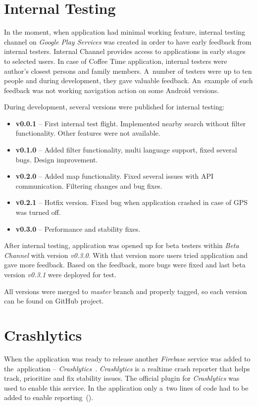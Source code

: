 \section{Internal Testing}
In the moment, when application had minimal working feature, internal testing channel on \textit{Google Play Services} was created in order to have early feedback from internal testers. Internal Channel provides access to applications in early stages to selected users. In case of Coffee Time application, internal testers were author's closest persons and family members. A~number of testers were up to ten people and during development, they gave valuable feedback. An~example of such feedback was not working navigation action on some Android versions. 

During development, several versions were published for internal testing:

\begin{itemize}
    \item \textbf{v0.0.1} -- First internal test flight. Implemented nearby search without filter functionality. Other features were not available. 
    \item \textbf{v0.1.0} -- Added filter functionality, multi language support, fixed several bugs. Design improvement. 
    \item \textbf{v0.2.0} -- Added map functionality. Fixed several issues with API communication. Filtering changes and bug fixes.
    \item \textbf{v0.2.1} -- Hotfix version. Fixed bug when application crashed in case of GPS was turned off. 
    \item \textbf{v0.3.0} -- Performance and stability fixes. 
\end{itemize}

After internal testing, application was opened up for beta testers within \textit{Beta Channel} with version \textit{v0.3.0}. With that version more users tried application and gave more feedback. Based on the feedback, more bugs were fixed and last beta version \textit{v0.3.1} were deployed for test. 

All versions were merged to \textit{master} branch and properly tagged, so each version can be found on GitHub project. 

\section{Crashlytics}
When the application was ready to release another \textit{Firebase} service was added to the~application -- \textit{Crashlytics}~\cite{firebase-crashlytics}. \textit{Crashlytics} is a realtime crash reporter that helps track, prioritize and fix stability issues. The official plugin for \textit{Crashlytics} was used to enable this service. In the application only a~two lines of code had to be added to enable reporting~().

